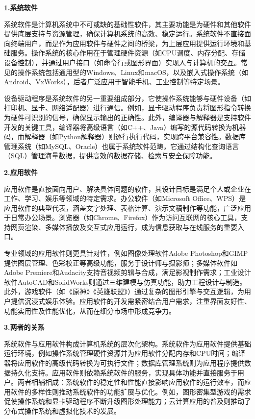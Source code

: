 \documentclass[12pt,a4paper]{article}
\begin{document}
\textbf{1.系统软件}

系统软件是计算机系统中不可或缺的基础性软件，其主要功能是为硬件和其他软件提供底层支持与资源管理，确保计算机系统的高效、稳定运行。系统软件不直接面向终端用户，而是作为应用软件与硬件之间的桥梁，为上层应用提供运行环境和基础服务。操作系统的核心作用在于管理硬件资源（如CPU调度、内存分配、存储设备控制），并通过用户接口（如命令行或图形界面）实现人与计算机的交互。常见的操作系统包括通用型的Windows、Linux和macOS，以及嵌入式操作系统（如Android、VxWorks），后者广泛应用于智能手机、工业控制等特定场景。

设备驱动程序是系统软件的另一重要组成部分，它使操作系统能够与硬件设备（如打印机、显卡、网络适配器）进行通信。例如，显卡驱动程序负责将图形指令转换为硬件可识别的信号，确保显示输出的正确性。此外，编译器与解释器是支持软件开发的关键工具，编译器将高级语言（如C++、Java）编写的源代码转换为机器码，而解释器（如Python解释器）则逐行执行代码，实现跨平台兼容性。数据库管理系统（如MySQL、Oracle）也属于系统软件范畴，它通过结构化查询语言（SQL）管理海量数据，提供高效的数据存储、检索与安全保障功能。

\textbf{2.应用软件}

应用软件是直接面向用户、解决具体问题的软件，其设计目标是满足个人或企业在工作、学习、娱乐等领域的特定需求。办公软件（如Microsoft
Office、WPS）是应用软件的典型代表，涵盖文字处理、表格计算、演示文稿制作等功能，广泛应用于日常办公场景。浏览器（如Chrome、Firefox）作为访问互联网的核心工具，支持网页渲染、多媒体播放及交互式应用运行，成为信息获取与在线服务的重要入口。

专业领域的应用软件则更具针对性，例如图像处理软件Adobe
Photoshop和GIMP提供图层管理、色彩校正等高级功能，服务于设计师与摄影师；多媒体软件如Adobe
Premiere和Audacity支持音视频剪辑与合成，满足影视制作需求；工业设计软件AutoCAD和SolidWorks则通过三维建模与仿真功能，助力工程设计与制造。此外，游戏软件（如《原神》《英雄联盟》）通过复杂的图形引擎与交互逻辑，为用户提供沉浸式娱乐体验。应用软件的开发需紧密结合用户需求，注重界面友好性、功能实用性及性能优化，从而在细分市场中形成竞争力。

\textbf{3.两者的关系}

系统软件与应用软件构成计算机系统的层次化架构。系统软件为应用软件提供基础运行环境，例如操作系统管理硬件资源并为应用软件分配内存和CPU时间；编译器将应用软件的高级代码转换为可执行文件；数据库管理系统则为应用程序提供数据持久化支持。应用软件则依赖系统软件的服务，实现具体功能并直接服务于用户。两者相辅相成：系统软件的稳定性和性能直接影响应用软件的运行效率，而应用软件的多样性则推动系统软件的功能扩展与优化。例如，图形密集型游戏的需求促使操作系统和显卡驱动程序不断升级图形处理能力；云计算应用的普及则推动了分布式操作系统和虚拟化技术的发展。
\end{document}
